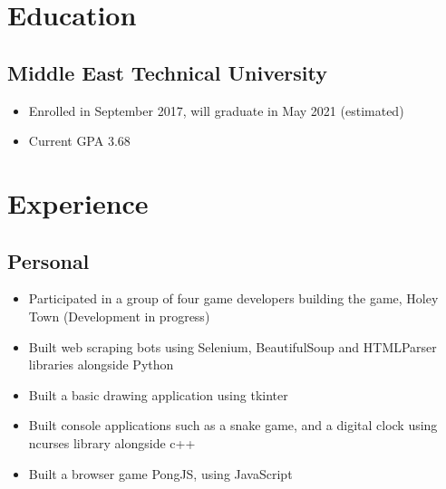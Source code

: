 \documentclass[]{props}
\begin{document}

\section{Education}
\subsection{Middle East Technical University}
\begin{itemize}
    \item[] Enrolled in September 2017, will graduate in May 2021 (estimated)
    \item[] Current GPA 3.68
\end{itemize}

\section{Experience}
\subsection{Personal}

\begin{itemize}
    \item[] Participated in a group of four game developers building the game, Holey Town (Development in progress)
    \item[] Built web scraping bots using Selenium, BeautifulSoup and HTMLParser libraries alongside Python
    \item[] Built a basic drawing application using tkinter
    \item[] Built console applications such as a snake game, and a digital clock using ncurses library alongside c++
    \item[] Built a browser game PongJS, using JavaScript
\end{itemize}
\end{document}
